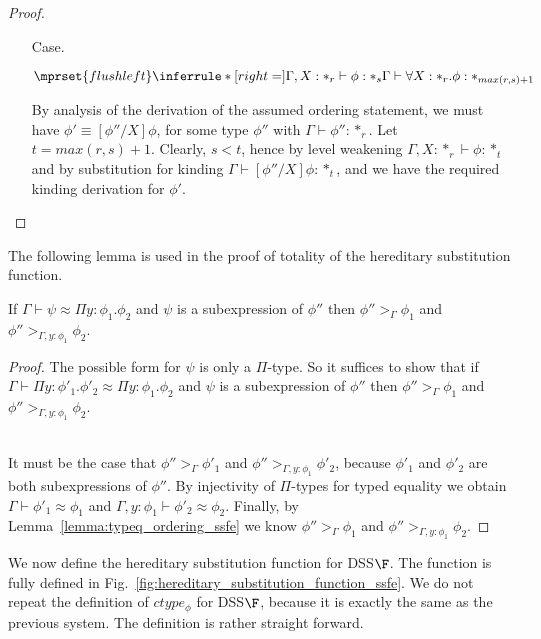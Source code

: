\begin{proof}
\begin{itemize}
\item[Case.]\ \\
  \begin{center}
    \begin{math}
      $$\mprset{flushleft}
      \inferrule* [right=] {
        \Gamma,X : *_r \vdash \phi : *_s
      }{\Gamma \vdash \forall X:*_r.\phi : *_{max(r,s)+1}}
    \end{math}
  \end{center}
  By analysis of the derivation of the assumed ordering statement, we must have 
  $\phi' \equiv [\phi''/X]\phi$, for some type $\phi''$ with 
  $\Gamma \vdash \phi'':*_r$.  Let $t = max(r,s) + 1$. Clearly, 
  $s < t$, hence by level weakening $\Gamma,X:*_r \vdash \phi:*_t$ and by substitution 
  for kinding $\Gamma \vdash [\phi''/X]\phi:*_t$, and we have the required kinding 
  derivation for $\phi'$.  
\end{itemize}
\end{proof}
The following lemma is used in the proof of totality of the hereditary substitution function.
\begin{lemma}[]
  \label{lemma:A_prop_ssfe}
  If $\Gamma \vdash \psi \approx \Pi y:\phi_1.\phi_2$ and $\psi$ is a subexpression of $\phi''$ then
  $\phi'' >_\Gamma \phi_1$ and $\phi'' >_{\Gamma,y:\phi_1} \phi_2$.
\end{lemma}
\begin{proof}
  The possible form for $\psi$ is only a $\Pi$-type.  So it suffices to show that
  if $\Gamma \vdash \Pi y:\phi'_1.\phi'_2 \approx \Pi y:\phi_1.\phi_2$ and $\psi$ is
  a subexpression of $\phi''$ then $\phi'' >_\Gamma \phi_1$ and $\phi'' >_{\Gamma,y:\phi_1} \phi_2$.

  \ \\
  It must be the case that $\phi'' >_\Gamma \phi'_1$ and $\phi'' >_{\Gamma,y:\phi_1} \phi'_2$, because
  $\phi'_1$ and $\phi'_2$ are both subexpressions of $\phi''$.  By injectivity of $\Pi$-types
  for typed equality we obtain $\Gamma \vdash \phi'_1 \approx \phi_1$ and $\Gamma,y:\phi_1 \vdash \phi'_2 \approx \phi_2$.
  Finally, by Lemma~\ref{lemma:typeq_ordering_ssfe} we know $\phi'' >_\Gamma \phi_1$ and $\phi'' >_{\Gamma,y:\phi_1} \phi_2$.
\end{proof}
We now define the hereditary substitution function for DSS$\F$.  The
function is fully defined in
Fig.~\ref{fig:hereditary_substitution_function_ssfe}.  We do not
repeat the definition of $ctype_\phi$ for DSS$\F$, because it is
exactly the same as the previous system. The definition is rather
straight forward.  
